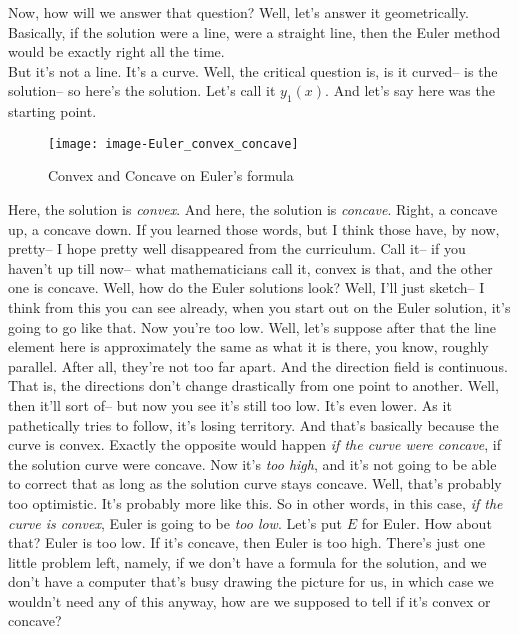 Now, how will we answer that question?
Well, let's answer it geometrically.
Basically, if the solution were a line, were a straight line,
then the Euler method would be exactly right all the time.\\
But it's not a line.
It's a curve.
Well, the critical question is, is it curved-- is the solution-- so here's the solution.
Let's call it $y_1 (x)$.
And let's say here was the starting point.

\begin{wrapfigure}{r}{5.5cm}
  \texttt{[image: image-Euler\_convex\_concave]}
  \caption{Convex and Concave on Euler's formula}
\end{wrapfigure}

Here, the solution is \emph{convex}.
And here, the solution is \emph{concave}.
Right, a concave up, a concave down. 
If you learned those words, but I think those have, by now, pretty--
I hope pretty well disappeared from the curriculum.
Call it-- if you haven't up till now--
what mathematicians call it, convex is that, and the other one is concave.
Well, how do the Euler solutions look?
Well, I'll just sketch--
I think from this you can see already, when you start out
on the Euler solution, it's going to go like that.
Now you're too low.
Well, let's suppose after that the line element here is approximately the same as what it is there,
you know, roughly parallel.
After all, they're not too far apart.
And the direction field is continuous.
That is, the directions don't change drastically from one point to another.
Well, then it'll sort of-- but now you see it's still too low.
It's even lower.
As it pathetically tries to follow, it's losing territory.
And that's basically because the curve is convex.
Exactly the opposite would happen \emph{if the curve were concave}, if the solution curve
were concave.
Now it's \emph{too high}, and it's not going to be able to correct that as long as the solution
curve stays concave.
Well, that's probably too optimistic.
It's probably more like this.
So in other words, in this case, \emph{if the curve is convex}, Euler is going to be \emph{too low}.
Let's put $E$ for Euler.
How about that?
Euler is too low.
If it's concave, then Euler is too high.
There's just one little problem left, namely,
if we don't have a formula for the solution,
and we don't have a computer that's
busy drawing the picture for us, in which case
we wouldn't need any of this anyway, how are we supposed to tell if it's convex or concave? \\


